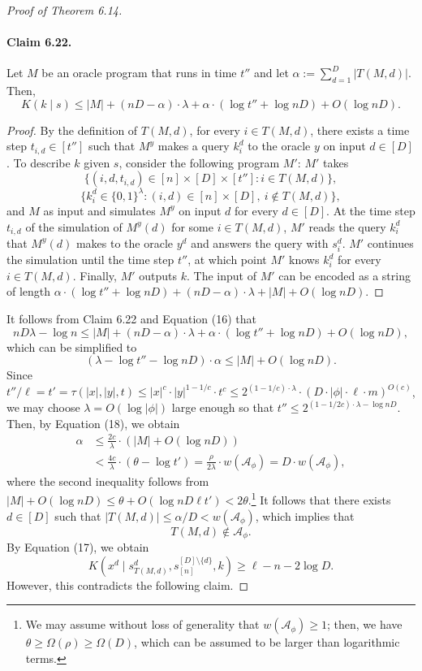 \begin{proof}[Proof of Theorem 6.14]
\paragraph{Claim 6.22.}
Let $M$ be an oracle program that runs in time $t''$ and let $\alpha:=\sum_{d=1}^D|T(M,d)|$. Then,
\[K(k\mid s)\leq|M|+(nD-\alpha)\cdot\lambda+\alpha\cdot(\log t''+\log nD)+O(\log nD).\]
\begin{proof}
By the definition of $T(M,d)$, for every $i\in T(M,d)$, there exists a time step $t_{i,d}\in[t'']$ such that $M^y$ makes a query $k_i^d$ to the oracle $y$ on input $d\in[D]$. To describe $k$ given $s$, consider the following program $M'$: $M'$ takes
\[\{(i,d,t_{i,d})\in[n]\times[D]\times[t'']:i\in T(M,d)\},\]
\[\{k_i^d\in\{0,1\}^\lambda:(i,d)\in[n]\times[D],\ i\notin T(M,d)\},\]
and $M$ as input and simulates $M^y$ on input $d$ for every $d\in[D]$. At the time step $t_{i,d}$ of the simulation of $M^y(d)$ for some $i\in T(M,d)$, $M'$ reads the query $k_i^d$ that $M^y(d)$ makes to the oracle $y^d$ and answers the query with $s_i^d$. $M'$ continues the simulation until the time step $t''$, at which point $M'$ knows $k_i^d$ for every $i\in T(M,d)$. Finally, $M'$ outputs $k$. The input of $M'$ can be encoded as a string of length $\alpha\cdot(\log t''+\log nD)+(nD-\alpha)\cdot\lambda+|M|+O(\log nD)$.
\end{proof}
It follows from Claim 6.22 and Equation (16) that
\[nD\lambda-\log n\leq|M|+(nD-\alpha)\cdot\lambda+\alpha\cdot(\log t''+\log nD)+O(\log nD),\]
which can be simplified to
\[(\lambda-\log t''-\log nD)\cdot\alpha\leq|M|+O(\log nD).\tag{18}\]
Since $t''/\ell=t'=\tau(|x|,|y|,t)\leq|x|^c\cdot|y|^{1-1/c}\cdot t^c\leq2^{(1-1/c)\cdot\lambda}\cdot(D\cdot|\phi|\cdot\ell\cdot m)^{O(c)}$, we may choose $\lambda=O(\log|\phi|)$ large enough so that $t''\leq2^{(1-1/2c)\cdot\lambda-\log nD}$. Then, by Equation (18), we obtain
\begin{align*}
\alpha&\leq\frac{2c}{\lambda}\cdot(|M|+O(\log nD))\\
&<\frac{4c}{\lambda}\cdot(\theta-\log t')=\frac\rho{2\lambda}\cdot w(\mathcal A_\phi)=D\cdot w(\mathcal A_\phi),
\end{align*}
where the second inequality follows from $|M|+O(\log nD)\leq\theta+O(\log nD\ell t')<2\theta$.\footnote{We may assume without loss of generality that $w(\mathcal A_\phi)\geq1$; then, we have $\theta\geq\Omega(\rho)\geq\Omega(D)$, which can be assumed to be larger than logarithmic terms.} It follows that there exists $d\in[D]$ such that $|T(M,d)|\leq\alpha/D<w(\mathcal A_\phi)$, which implies that
\[T(M,d)\notin\mathcal A_\phi.\]
By Equation (17), we obtain
\[K(x^d\mid s_{T(M,d)}^d,s_{[n]}^{[D]\setminus\{d\}},k)\geq\ell-n-2\log D.\]
However, this contradicts the following claim.

\end{proof}
